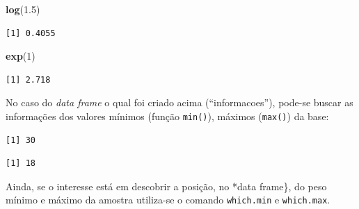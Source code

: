 \documentclass[12pt,brazil,]{book}
\newenvironment{Shaded}{\begin{snugshade}}{\end{snugshade}}
\newcommand{\CommentTok}[1]{\textcolor[rgb]{0.56,0.35,0.01}{\textit{#1}}}
\newcommand{\DecValTok}[1]{\textcolor[rgb]{0.00,0.00,0.81}{#1}}
\newcommand{\FloatTok}[1]{\textcolor[rgb]{0.00,0.00,0.81}{#1}}
\newcommand{\KeywordTok}[1]{\textcolor[rgb]{0.13,0.29,0.53}{\textbf{#1}}}
\newcommand{\NormalTok}[1]{#1}
\newcommand{\OperatorTok}[1]{\textcolor[rgb]{0.81,0.36,0.00}{\textbf{#1}}}
\begin{document}
\begin{Shaded}
\begin{Highlighting}[]
\KeywordTok{log}\NormalTok{(}\FloatTok{1.5}\NormalTok{)}
\end{Highlighting}
\end{Shaded}

\begin{verbatim}
[1] 0.4055
\end{verbatim}

\begin{Shaded}
\begin{Highlighting}[]
\KeywordTok{exp}\NormalTok{(}\DecValTok{1}\NormalTok{)}
\end{Highlighting}
\end{Shaded}

\begin{verbatim}
[1] 2.718
\end{verbatim}

No caso do \emph{data frame} o qual foi criado acima (``informacoes''),
pode-se buscar as informações dos valores mínimos (função
\texttt{min()}), máximos (\texttt{max()}) da base:

\begin{Shaded}
\end{Shaded}

\begin{verbatim}
[1] 30
\end{verbatim}

\begin{Shaded}
\end{Shaded}

\begin{verbatim}
[1] 18
\end{verbatim}

Ainda, se o interesse está em descobrir a posição, no *data frame\}, do
peso mínimo e máximo da amostra utiliza-se o comando \texttt{which.min}
e \texttt{which.max}.

\begin{Shaded}
\end{Shaded}
\end{document}
